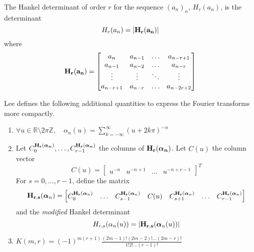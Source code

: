 \begin{deftn}\label{def:Hankel}
  The Hankel determinant of order $r$ for the sequence ${(a_n)}_n$, $H_r(a_n)$, is the determinant
  \begin{equation}
      H_r(a_n) = |\mathbf{H_r(a_n)}|
   \end{equation}
  where
  \begin{equation*}
    \mathbf{H_r(a_n)} = \begin{bmatrix} a_n & a_{n-1} & \hdots & a_{n-r+1} \\
      a_{n-1} & a_{n-2} & \hdots & a_{n-r} \\
      \vdots & \vdots & \ddots & \vdots \\
      a_{n-r+1} & a_{n-r} & \hdots & a_{n-2r+2}  
    \end{bmatrix}
  \end{equation*}
\end{deftn}

Lee defines the following additional quantities to express the Fourier transforms more compactly.
\begin{enumerate}
  \item $\forall u \in \mathbb{R}\setminus2\pi\mathbb{Z}, \quad \displaystyle \alpha_n(u) = \sum_{k=-\infty}^{\infty} 
    {(u+2k\pi)}^{-n}$
  \item Let $C^{\mathbf{H_r}(\bm{\alpha_n})}_0, \ldots, C_{r-1}^{\mathbf{H_r}(\bm{\alpha_n})}$ the columns of 
    $\mathbf{H_r}(\bm{\alpha_n})$.  Let $C(u)$ the column vector \begin{equation}
      C(u) = \begin{bmatrix} u^{-n} & u^{-n+1} & \hdots & u^{-n+r-1} \end{bmatrix}^T
    \end{equation}
    For $s=0, \ldots, r-1$,  define the matrix
    \begin{equation*}
      \mathbf{H_{r,s}}(\bm{\alpha}_n) = \begin{bmatrix} C_0^{\mathbf{H_r}({\bm{\alpha}}_n)} & \ldots & 
	C_{s-1}^{\mathbf{H_r}({\bm{\alpha}}_n)} & C(u) & C_{s+1}^{\mathbf{H_r}({\bm{\alpha}}_n)} & \hdots & 
	C_{r-1}^{\mathbf{H_r}({\bm{\alpha}}_n)}
      \end{bmatrix}
    \end{equation*}
    and the \emph{modified} Hankel determinant
    \begin{equation}\label{eq:modified-Hankel}
    H_{r,s}(\alpha_n(u)) = |\mathbf{H_{r,s}}({\bm{\alpha}}_n(u))|
  \end{equation}
  \item $K(m,r) = {(-1)}^{m(r+1)} \frac{(2m-1)!(2m-2)!\ldots(2m-r)!}{1!2!\ldots(r-1)!}$
\end{enumerate}

